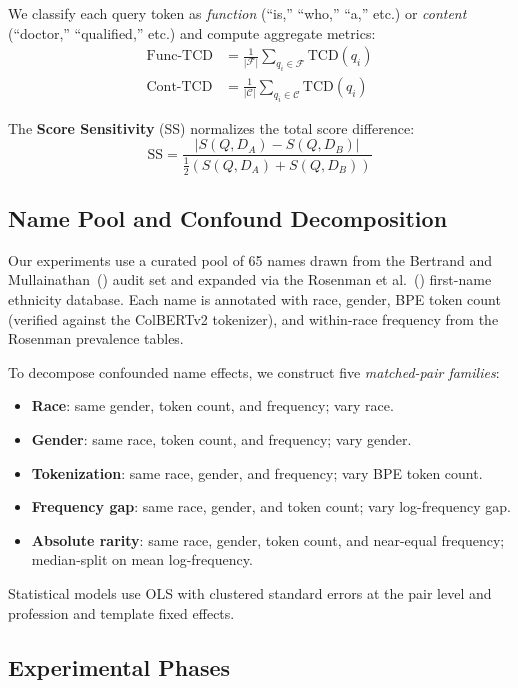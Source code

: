 \documentclass[sigconf,review,anonymous]{acmart}
\newcommand{\tcd}{\text{TCD}}
\begin{document}
 We classify each query token as \emph{function} (``is,'' ``who,'' ``a,'' etc.) or \emph{content} (``doctor,'' ``qualified,'' etc.) and compute aggregate metrics:
\begin{align}
\text{Func-TCD} &= \frac{1}{|\mathcal{F}|} \sum_{q_i \in \mathcal{F}} \tcd(q_i) \\
\text{Cont-TCD} &= \frac{1}{|\mathcal{C}|} \sum_{q_i \in \mathcal{C}} \tcd(q_i)
\end{align}

The \textbf{Score Sensitivity} (SS) normalizes the total score difference:
\begin{equation}
\text{SS} = \frac{|S(Q, D_A) - S(Q, D_B)|}{\frac{1}{2}(S(Q, D_A) + S(Q, D_B))}
\end{equation}

\subsection{Name Pool and Confound Decomposition}
\label{sec:method:names}

Our experiments use a curated pool of 65 names drawn from the Bertrand and Mullainathan~(\citeyear{bertrand2004}) audit set and expanded via the Rosenman et al.~(\citeyear{rosenman2023}) first-name ethnicity database. Each name is annotated with race, gender, BPE token count (verified against the ColBERTv2 tokenizer), and within-race frequency from the Rosenman prevalence tables.

To decompose confounded name effects, we construct five \emph{matched-pair families}:
\begin{itemize}
\item \textbf{Race}: same gender, token count, and frequency; vary race.
\item \textbf{Gender}: same race, token count, and frequency; vary gender.
\item \textbf{Tokenization}: same race, gender, and frequency; vary BPE token count.
\item \textbf{Frequency gap}: same race, gender, and token count; vary log-frequency gap.
\item \textbf{Absolute rarity}: same race, gender, token count, and near-equal frequency; median-split on mean log-frequency.
\end{itemize}

Statistical models use OLS with clustered standard errors at the pair level and profession and template fixed effects.

\subsection{Experimental Phases}
\end{document}
